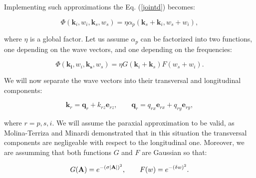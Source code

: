 \documentclass[12pt]{book}
\begin{document}
Implementing such approximations the Eq. (\ref{jointd}) becomes:

\begin{equation}
\Phi(\mathbf{k}_{i},w_{i},\mathbf{k}_{s},w_{s})= \eta \alpha_{p}(\mathbf{k}_{s}+\mathbf{k}_{i},w_{s}+w_{i}) ,
\end{equation}


where $\eta$ is a global factor. Let us assume  $\alpha_{p}$ can be factorized into two functions, one depending on the wave vectors, and one depending on the frequencies:

\begin{equation}
\Phi(\mathbf{k_{i}},w_{i},\mathbf{k_{s}},w_{s})= \eta G(\mathbf{k}_{i}+\mathbf{k}_{s}) F(w_{s}+w_{i}) .
\end{equation}
 
We  will now separate the wave vectors into their transversal and longitudinal components:

\begin{equation}
\mathbf{k}_{r}=\mathbf{q}_{r}+k_{rz} \mathbf{e}_{rz},\qquad \mathbf{q}_{r}=q_{rx} \mathbf{e}_{rx}+q_{ry} \mathbf{e}_{ry},
\end{equation}

where $r=p, s, i$. We will assume the paraxial approximation to be valid,  as Molina-Terriza and Minardi \cite{minardi} demonstrated that in this situation the transversal components are negligeable with respect to the longitudinal one. Moreover, we are assumming that both functions $G$ and $F$ are Gaussian so that:

\begin{equation}
G(\mathbf{A})=e^{- (\sigma \abs{\mathbf{A}})^{2} },\qquad F(w)=e^{-(\delta w)^2}.
\end{equation}
\end{document}
